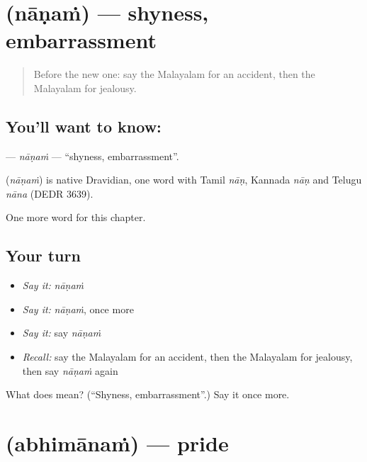 \section[\texorpdfstring{\ml{നാണം} (nāṇaṁ)}{നാണം (nāṇaṁ)}]{ (nāṇaṁ) — shyness, embarrassment}

\label{lesson:ML-C193-nanam}



\begin{quote}
Before the new one: say the Malayalam for an accident, then the Malayalam for jealousy.
\end{quote}

\subsection*{You'll want to know: }
\textbf{} — \emph{nāṇaṁ} — \textquotedblleft{}shyness, embarrassment\textquotedblright{}.

\begin{cousinweb}
\textbf{} (\emph{nāṇaṁ}) is native Dravidian, one word with Tamil \emph{nāṇ}, Kannada \emph{nāṇ} and Telugu \emph{nāna} (DEDR 3639).
\end{cousinweb}

\begin{grammarlens}[title={What you've built}]
One more word for this chapter.
\end{grammarlens}

\subsection*{Your turn}
\begin{itemize}
\raggedright
  \item \emph{Say it:} \emph{nāṇaṁ}
  \item \emph{Say it:} \emph{nāṇaṁ}, once more
  \item \emph{Say it:} say \emph{nāṇaṁ}
  \item \emph{Recall:} say the Malayalam for an accident, then the Malayalam for jealousy, then say \emph{nāṇaṁ} again
\end{itemize}

\begin{tcolorbox}[breakable,colback=teal!4,colframe=teal!35!black,title={Before you move on}]
What does  mean? (\textquotedblleft{}Shyness, embarrassment\textquotedblright{}.) Say it once more.
\end{tcolorbox}
\section[\texorpdfstring{\ml{അഭിമാനം} (abhimānaṁ)}{അഭിമാനം (abhimānaṁ)}]{ (abhimānaṁ) — pride}

